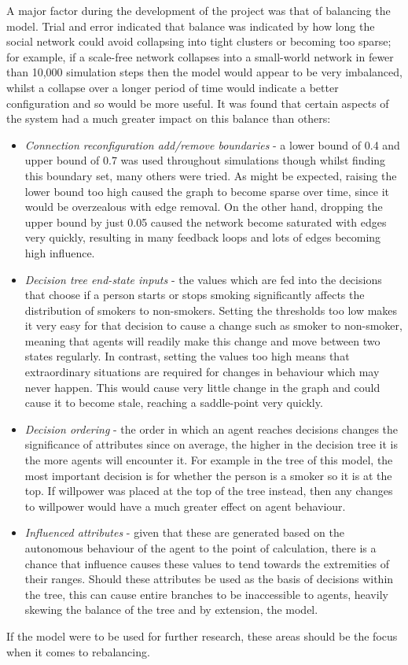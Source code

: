 \documentclass[]{report}
\begin{document}
A major factor during the development of the project was that of balancing the model. Trial and error indicated that balance was indicated by how long the social network could avoid collapsing into tight clusters or becoming too sparse; for example, if a scale-free network collapses into a small-world network in fewer than 10,000 simulation steps then the model would appear to be very imbalanced, whilst a collapse over a longer period of time would indicate a better configuration and so would be more useful. It was found that certain aspects of the system had a much greater impact on this balance than others:
\begin{itemize}
\item \emph{Connection reconfiguration add/remove boundaries} - a lower bound of 0.4 and upper bound of 0.7 was used throughout simulations though whilst finding this boundary set, many others were tried. As might be expected, raising the lower bound too high caused the graph to become sparse over time, since it would be overzealous with edge removal. On the other hand, dropping the upper bound by just 0.05 caused the network become saturated with edges very quickly, resulting in many feedback loops and lots of edges becoming high influence.
\item \emph{Decision tree end-state inputs} - the values which are fed into the decisions that choose if a person starts or stops smoking significantly affects the distribution of smokers to non-smokers. Setting the thresholds too low makes it very easy for that decision to cause a change such as smoker to non-smoker, meaning that agents will readily make this change and move between two states regularly. In contrast, setting the values too high means that extraordinary situations are required for changes in behaviour which may never happen. This would cause very little change in the graph and could cause it to become stale, reaching a saddle-point very quickly.
\item \emph{Decision ordering} - the order in which an agent reaches decisions changes the significance of attributes since on average, the higher in the decision tree it is the more agents will encounter it. For example in the tree of this model, the most important decision is for whether the person is a smoker so it is at the top. If willpower was placed at the top of the tree instead, then any changes to willpower would have a much greater effect on agent behaviour.
\item \emph{Influenced attributes} - given that these are generated based on the autonomous behaviour of the agent to the point of calculation, there is a chance that influence causes these values to tend towards the extremities of their ranges. Should these attributes be used as the basis of decisions within the tree, this can cause entire branches to be inaccessible to agents, heavily skewing the balance of the tree and by extension, the model.
\end{itemize}
If the model were to be used for further research, these areas should be the focus when it comes to rebalancing.
\end{document}
